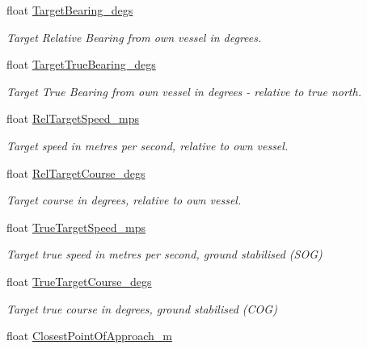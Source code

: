\begin{DoxyCompactItemize}
float \mbox{\hyperlink{struct_quantum_lib_1_1_marpa_data__t_a61c66e1b61e724254ba2e6db2fc43b52}{Target\+Bearing\+\_\+degs}}
\begin{DoxyCompactList}\small\item\em Target Relative Bearing from own vessel in degrees. \end{DoxyCompactList}\item 
float \mbox{\hyperlink{struct_quantum_lib_1_1_marpa_data__t_a3ba68621eb664a06d8ff89367e12b88d}{Target\+True\+Bearing\+\_\+degs}}
\begin{DoxyCompactList}\small\item\em Target True Bearing from own vessel in degrees -\/ relative to true north. \end{DoxyCompactList}\item 
float \mbox{\hyperlink{struct_quantum_lib_1_1_marpa_data__t_ab4dc9b119ae1eb0b4973254750fc04c1}{Rel\+Target\+Speed\+\_\+mps}}
\begin{DoxyCompactList}\small\item\em Target speed in metres per second, relative to own vessel. \end{DoxyCompactList}\item 
float \mbox{\hyperlink{struct_quantum_lib_1_1_marpa_data__t_a5e5047f6cb2244d2b547931151b8053d}{Rel\+Target\+Course\+\_\+degs}}
\begin{DoxyCompactList}\small\item\em Target course in degrees, relative to own vessel. \end{DoxyCompactList}\item 
float \mbox{\hyperlink{struct_quantum_lib_1_1_marpa_data__t_a295cd85270bb01f6d58c9ff442a9d50d}{True\+Target\+Speed\+\_\+mps}}
\begin{DoxyCompactList}\small\item\em Target true speed in metres per second, ground stabilised (S\+OG) \end{DoxyCompactList}\item 
float \mbox{\hyperlink{struct_quantum_lib_1_1_marpa_data__t_a9e396415e46fdf5daa123eabaf06eb19}{True\+Target\+Course\+\_\+degs}}
\begin{DoxyCompactList}\small\item\em Target true course in degrees, ground stabilised (C\+OG) \end{DoxyCompactList}\item 
float \mbox{\hyperlink{struct_quantum_lib_1_1_marpa_data__t_ad1662ab0801a78c8b7610363ba4b0db9}{Closest\+Point\+Of\+Approach\+\_\+m}}

\end{DoxyCompactItemize}
